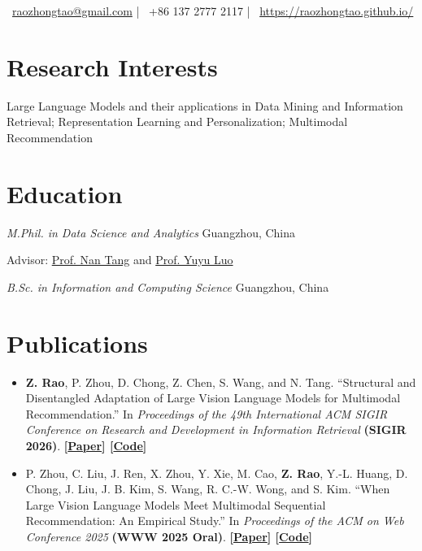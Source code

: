\documentclass{resume}
\begin{document}
\pagestyle{empty}

\begin{center}
  {\faEnvelope}\ \href{mailto:raozhongtao@gmail.com}{raozhongtao@gmail.com} |
  {\faPhone}\ {+86 137 2777 2117} |
  {\faGithub}\ \href{https://raozhongtao.github.io/}{https://raozhongtao.github.io/}
\end{center}
\vspace{-0.8em}


\section{Research Interests}
Large Language Models and their applications in Data Mining and Information Retrieval; Representation Learning and Personalization; Multimodal Recommendation

\section{Education}
\textit{M.Phil. in Data Science and Analytics}
\hfill Guangzhou, China

Advisor: \href{https://nantang.github.io/}{Prof. Nan Tang} and \href{https://luoyuyu.vip/}{Prof. Yuyu Luo}


\textit{B.Sc. in Information and Computing Science} \hfill Guangzhou, China

\section{Publications}
\begin{itemize}
  \item \textbf{Z. Rao}, P. Zhou, D. Chong, Z. Chen, S. Wang, and N. Tang.
  ``Structural and Disentangled Adaptation of Large Vision Language Models for Multimodal Recommendation.''
  In \textit{Proceedings of the 49th International ACM SIGIR Conference on Research and Development in Information Retrieval} \textbf{(SIGIR 2026)}.
  \textbf{[\href{https://doi.org/10.1145/3805712.3809977}{Paper}]
  [\href{https://github.com/RaoZhongtao/SDA}{Code}]}

  \item P. Zhou, C. Liu, J. Ren, X. Zhou, Y. Xie, M. Cao, \textbf{Z. Rao}, Y.-L. Huang, D. Chong, J. Liu, J. B. Kim, S. Wang, R. C.-W. Wong, and S. Kim.
  ``When Large Vision Language Models Meet Multimodal Sequential Recommendation: An Empirical Study.''
  In \textit{Proceedings of the ACM on Web Conference 2025} \textbf{(WWW 2025 Oral)}.
  \textbf{[\href{https://doi.org/10.1145/3696410.3714764}{Paper}]
   [\href{https://github.com/PALIN2018/MSRBench}{Code}]}
\end{itemize}
\end{document}
